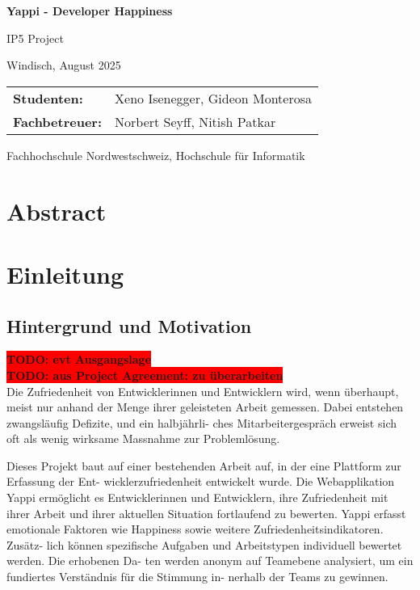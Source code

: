 \documentclass[12pt,a4paper]{report}
\newcommand{\todo}[1]{\colorbox{red}{\textbf{TODO: #1}}\\}
\begin{document}
\begin{titlepage}
  \centering
  {\huge \textbf{Yappi - Developer Happiness} \par}
  {\large IP5 Project \par}
  \vspace{0.5cm}
  {Windisch, August 2025 \par}
  \vspace{0.5cm}

  \begin{tabular}{@{}ll@{}}
    \textbf{Studenten:}    & Xeno Isenegger, Gideon Monterosa \\
    \textbf{Fachbetreuer:} & Norbert Seyff, Nitish Patkar
  \end{tabular}

  \vfill
  {Fachhochschule Nordwestschweiz, Hochschule für Informatik \par}
\end{titlepage}

\chapter*{Abstract}
\newpage

\tableofcontents
\newpage

\listoffigures
\newpage

\listoftables
\newpage

\chapter{Einleitung}

\section{Hintergrund und Motivation}
\todo{evt Ausgangslage}

\todo{aus Project Agreement: zu überarbeiten}

Die Zufriedenheit von Entwicklerinnen und Entwicklern wird, wenn überhaupt, meist nur anhand der
Menge ihrer geleisteten Arbeit gemessen. Dabei entstehen zwangsläufig Defizite, und ein halbjährli-
ches Mitarbeitergespräch erweist sich oft als wenig wirksame Massnahme zur Problemlösung.

Dieses Projekt baut auf einer bestehenden Arbeit auf, in der eine Plattform zur Erfassung der Ent-
wicklerzufriedenheit entwickelt wurde. Die Webapplikation Yappi ermöglicht es Entwicklerinnen und
Entwicklern, ihre Zufriedenheit mit ihrer Arbeit und ihrer aktuellen Situation fortlaufend zu bewerten.
Yappi erfasst emotionale Faktoren wie Happiness sowie weitere Zufriedenheitsindikatoren. Zusätz-
lich können spezifische Aufgaben und Arbeitstypen individuell bewertet werden. Die erhobenen Da-
ten werden anonym auf Teamebene analysiert, um ein fundiertes Verständnis für die Stimmung in-
nerhalb der Teams zu gewinnen.
\end{document}
